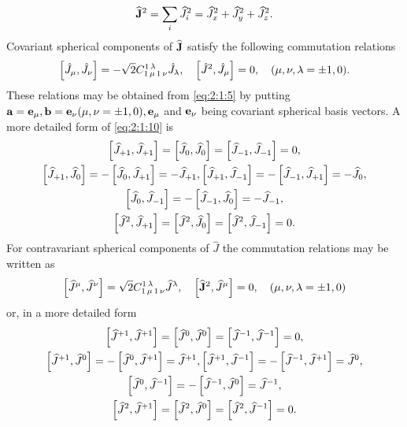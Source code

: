 \begin{equation}
\widehat{\mathbf{J}}^{2}=\sum_{i} \widehat{J}_{i}^{2}=\widehat{J}_{x}^{2}+\widehat{J}_{y}^{2}+\widehat{J}_{z}^{2}.\label{eq:2:1:9}
\end{equation}
Covariant spherical components of $\widehat{\mathbf{J}}$ satisfy the following commutation relations
\begin{equation}
\left[\hat{J}_{\mu}, \hat{J}_{\nu}\right]=-\sqrt{2} C_{1\,\mu\,1\,\nu}^{1\,\lambda} \hat{J}_{\lambda}, \quad\left[\hat{J}^{2}, \hat{J}_{\mu}\right]=0, \quad(\mu, \nu, \lambda= \pm 1,0). \label{eq:2:1:10}
\end{equation}
These relations may be obtained from \eqref{eq:2:1:5} by putting $\mathbf{a}=\mathbf{e}_{\mu}, \mathbf{b}=\mathbf{e}_{\nu}(\mu, \nu= \pm 1,0), \mathbf{e}_{\mu}$ and $\mathbf{e}_{\nu}$ being covariant spherical basis vectors. A more detailed form of \eqref{eq:2:1:10} is
\begin{gather}
{\left[\widehat{J}_{+1}, \widehat{J}_{+1}\right]=\left[\widehat{J}_{0}, \widehat{J}_{0}\right]=\left[\widehat{J}_{-1}, \widehat{J}_{-1}\right]=0},  \notag\\
{\left[\widehat{J}_{+1}, \widehat{J}_{0}\right]=-\left[\widehat{J}_{0}, \widehat{J}_{+1}\right]=-\widehat{J}_{+1},\left[\widehat{J}_{+1}, \widehat{J}_{-1}\right]=-\left[\widehat{J}_{-1}, \widehat{J}_{+1}\right]=-\widehat{J}_{0}} , \notag\\
{\left[\widehat{J}_{0}, \widehat{J}_{-1}\right]=-\left[\widehat{J}_{-1}, \widehat{J}_{0}\right]=-\widehat{J}_{-1}} , \label{eq:2:1:11}\\
{\left[\widehat{J}^{2}, \widehat{J}_{+1}\right]=\left[\widehat{J}^{2}, \widehat{J}_{0}\right]=\left[\widehat{J}^{2}, \widehat{J}_{-1}\right]=0}. \notag
\end{gather}
For contravariant spherical components of $\widehat{J}$ the commutation relations may be written as
\begin{equation}
\left[\widehat{J}^{\mu}, \widehat{J}^{\nu}\right]=\sqrt{2} C_{1\,\mu\,1\,\nu}^{1\,\lambda} \widehat{J}^{\lambda}, \quad\left[\widehat{\mathbf{J}}^{2}, \widehat{J}^{\mu}\right]=0, \quad(\mu, \nu, \lambda= \pm 1,0) \label{eq:2:1:12}
\end{equation}
or, in a more detailed form
\begin{gather}
{\left[\widehat{J}^{+1}, \widehat{J}^{+1}\right]=\left[\widehat{J}^{0}, \widehat{J}^{0}\right]=\left[\widehat{J}^{-1}, \widehat{J}^{-1}\right]=0},  \notag\\
{\left[\widehat{J}^{+1}, \widehat{J}^{0}\right]=-\left[\widehat{J}^{0}, \widehat{J}^{+1}\right]=\widehat{J}^{+1},\left[\widehat{J}^{+1}, \widehat{J}^{-1}\right]=-\left[\widehat{J}^{-1}, \widehat{J}^{+1}\right]=\widehat{J}^{0}} , \label{eq:2:1:13}\\
{\left[\widehat{J}^{0}, \widehat{J}^{-1}\right]=-\left[\widehat{J}^{-1}, \widehat{J}^{0}\right]=\widehat{J}^{-1}}  ,\notag\\
{\left[\widehat{J}^{2}, \widehat{J}^{+1}\right]=\left[\widehat{J}^{2}, \widehat{J}^{0}\right]=\left[\widehat{J}^{2}, \widehat{J}^{-1}\right]=0} .\notag
\end{gather}
